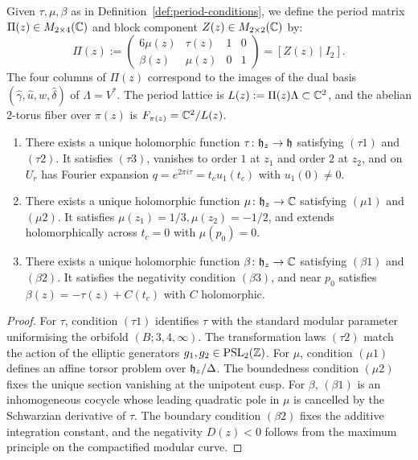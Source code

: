 \begin{definition}\label{def:period-matrix}
Given $\tau, \mu, \beta$ as in Definition~\ref{def:period-conditions}, we define the period matrix $\Pi(z) \in M_{2 \times 4}(\mathbb{C})$ and block component $Z(z) \in M_{2 \times 2}(\mathbb{C})$ by:
\[
\Pi(z) := \begin{pmatrix} 6\mu(z) & \tau(z) & 1 & 0 \\ \beta(z) & \mu(z) & 0 & 1 \end{pmatrix} = [Z(z) \mid I_2].
\]
The four columns of $\Pi(z)$ correspond to the images of the dual basis $(\hat\gamma, \hat u, \hat w, \hat\delta)$ of $\Lambda = V^*$.
The period lattice is $L(z) := \Pi(z)\Lambda \subset \mathbb{C}^2$, and the abelian $2$-torus fiber over $\pi(z)$ is $F_{\pi(z)} = \mathbb{C}^2 / L(z)$.
\end{definition}

\begin{theorem}\label{thm:period-existence}
\begin{enumerate}[label=(\roman*)]
    \item There exists a unique holomorphic function $\tau \colon \mathfrak{h}_z \to \mathfrak{h}$ satisfying $(\tau 1)$ and $(\tau 2)$. It satisfies $(\tau 3)$, vanishes to order $1$ at $z_1$ and order $2$ at $z_2$, and on $U_r$ has Fourier expansion $q = e^{2\pi i \tau} = t_c u_1(t_c)$ with $u_1(0) \ne 0$.
    \item There exists a unique holomorphic function $\mu \colon \mathfrak{h}_z \to \mathbb{C}$ satisfying $(\mu 1)$ and $(\mu 2)$. It satisfies $\mu(z_1) = 1/3, \mu(z_2) = -1/2$, and extends holomorphically across $t_c = 0$ with $\mu(p_0) = 0$.
    \item There exists a unique holomorphic function $\beta \colon \mathfrak{h}_z \to \mathbb{C}$ satisfying $(\beta 1)$ and $(\beta 2)$. It satisfies the negativity condition $(\beta 3)$, and near $p_0$ satisfies $\beta(z) = -\tau(z) + C(t_c)$ with $C$ holomorphic.
\end{enumerate}
\end{theorem}

\begin{proof}
For $\tau$, condition $(\tau 1)$ identifies $\tau$ with the standard modular parameter uniformising the orbifold $(B; 3, 4, \infty)$.
The transformation laws $(\tau 2)$ match the action of the elliptic generators $g_1, g_2 \in \mathrm{PSL}_2(\mathbb{Z})$.
For $\mu$, condition $(\mu 1)$ defines an affine torsor problem over $\mathfrak{h}_z/\Delta$. The boundedness condition $(\mu 2)$ fixes the unique section vanishing at the unipotent cusp.
For $\beta$, $(\beta 1)$ is an inhomogeneous cocycle whose leading quadratic pole in $\mu$ is cancelled by the Schwarzian derivative of $\tau$.
The boundary condition $(\beta 2)$ fixes the additive integration constant, and the negativity $D(z) < 0$ follows from the maximum principle on the compactified modular curve.
\end{proof}

